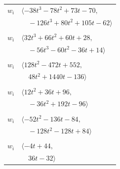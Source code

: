 \documentclass[11pt]{article}
\begin{document}
\begin{longtable}{@{}ll@{}}
$w_i$ & $\langle -38t^{3}-78t^{2}+73t-70,$\\
 & $\quad -126t^{3}+80t^{2}+105t-62\rangle$\\
\addlinespace[2pt]
\multicolumn{2}{@{}p{0.97\textwidth}@{}}{$i=2$, $D_i=4$, $\rho_{ij}$: $14{:}2, \allowbreak 16{:}2, \allowbreak 19{:}2, \allowbreak 35{:}1, \allowbreak 38{:}2, \allowbreak 39{:}2, \allowbreak 50{:}1, \allowbreak 52{:}2, \allowbreak 60{:}2$}\\
$w_i$ & $\langle 32t^{3}+66t^{2}+60t+28,$\\
 & $\quad -56t^{3}-60t^{2}-36t+14\rangle$\\
\addlinespace[2pt]
\multicolumn{2}{@{}p{0.97\textwidth}@{}}{$i=3$, $D_i=8$, $\rho_{ij}$: $1{:}2, \allowbreak 14{:}2, \allowbreak 20{:}2, \allowbreak 27{:}1, \allowbreak 37{:}2, \allowbreak 41{:}2, \allowbreak 43{:}2, \allowbreak 45{:}2, \allowbreak 50{:}2, \allowbreak 62{:}1, \allowbreak 63{:}2, \allowbreak 65{:}2, \allowbreak 72{:}2, \allowbreak 73{:}2$}\\
$w_i$ & $\langle 128t^{2}-472t+552,$\\
 & $\quad 48t^{2}+1440t-136\rangle$\\
\addlinespace[2pt]
\multicolumn{2}{@{}p{0.97\textwidth}@{}}{$i=4$, $D_i=4$, $\rho_{ij}$: $0{:}1, \allowbreak 13{:}2, \allowbreak 14{:}2, \allowbreak 29{:}2, \allowbreak 39{:}2, \allowbreak 47{:}2, \allowbreak 48{:}1, \allowbreak 59{:}2, \allowbreak 66{:}2, \allowbreak 67{:}2, \allowbreak 72{:}2$}\\
$w_i$ & $\langle 12t^{2}+36t+96,$\\
 & $\quad -36t^{2}+192t-96\rangle$\\
\addlinespace[2pt]
\multicolumn{2}{@{}p{0.97\textwidth}@{}}{$i=5$, $D_i=4$, $\rho_{ij}$: $1{:}1, \allowbreak 12{:}1, \allowbreak 14{:}1, \allowbreak 24{:}2, \allowbreak 28{:}1, \allowbreak 33{:}1, \allowbreak 36{:}2, \allowbreak 37{:}1, \allowbreak 48{:}2, \allowbreak 55{:}2, \allowbreak 56{:}2, \allowbreak 58{:}1, \allowbreak 59{:}2$}\\
$w_i$ & $\langle -52t^{2}-136t-84,$\\
 & $\quad -128t^{2}-128t+84\rangle$\\
\addlinespace[2pt]
\multicolumn{2}{@{}p{0.97\textwidth}@{}}{$i=6$, $D_i=4$, $\rho_{ij}$: $13{:}2, \allowbreak 14{:}2, \allowbreak 20{:}1, \allowbreak 25{:}1, \allowbreak 38{:}2, \allowbreak 39{:}2, \allowbreak 43{:}2, \allowbreak 53{:}2$}\\
$w_i$ & $\langle -4t+44,$\\
 & $\quad 36t-32\rangle$\\

\end{longtable}
\end{document}

